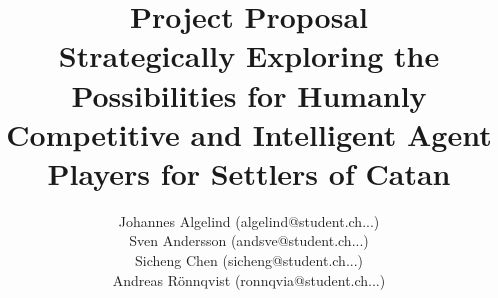 \documentclass[12pt,a4paper]{report}
\begin{document}
%

\title{\textbf{Project Proposal}\\Strategically Exploring the Possibilities for Humanly Competitive and Intelligent Agent Players for Settlers of Catan}
\author{Johannes Algelind (algelind@student.ch...)\\
        Sven Andersson (andsve@student.ch...)\\
        Sicheng Chen (sicheng@student.ch...)\\
        Andreas Rönnqvist (ronnqvia@student.ch...)}

\maketitle


%

\tableofcontents
\newpage

%

\setlength{\parindent}{0in}
\setlength{\parskip}{5mm}
\newpage
{}
\setcounter{page}{1}


%
%
%
%
%
%


%
%

%
\end{document}
